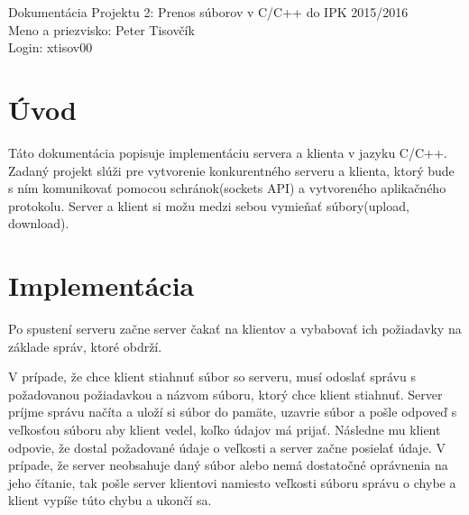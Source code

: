 \documentclass[10pt,a4paper,final]{article}
\begin{document}

  \pagestyle{plain}
  \setcounter{page}{1}
  
  \setlength{\parindent}{1cm}
  \setlength{\parskip}{0.2cm plus4mm minus3mm}
  
  \noindent
  Dokumentácia Projektu 2: Prenos súborov v C/C++ do IPK 2015/2016 \\
  Meno a priezvisko: Peter Tisovčík \\
  Login: xtisov00 \\
  


  \section{Úvod} \label{uvod}

Táto dokumentácia popisuje implementáciu servera a klienta v jazyku C/C++. Zadaný projekt slúži pre vytvorenie konkurentného serveru a klienta, ktorý bude s ním komunikovať pomocou schránok(sockets API) a vytvoreného aplikačného protokolu. Server a klient si možu medzi sebou vymieňať súbory(upload, download). 

  \section{Implementácia} \label{implementacia}

Po spustení serveru začne server čakať na klientov a vybabovať ich požiadavky na základe správ, ktoré obdrží. 

V prípade, že chce klient stiahnuť súbor so serveru,
musí odoslať správu s požadovanou požiadavkou a názvom súboru,
ktorý chce klient stiahnuť. Server príjme správu načíta a uloží
si súbor do pamäte, uzavrie súbor a pošle odpoveď s veľkosťou
súboru aby klient vedel, koľko údajov má prijať. Následne mu klient
odpovie, že dostal požadované údaje o veľkosti a server začne posielať údaje.
V prípade, že server neobsahuje daný súbor alebo nemá dostatočné
oprávnenia na jeho čítanie, tak pošle server klientovi namiesto veľkosti
súboru správu o chybe a klient vypíše túto chybu a ukončí sa.
\end{document}
